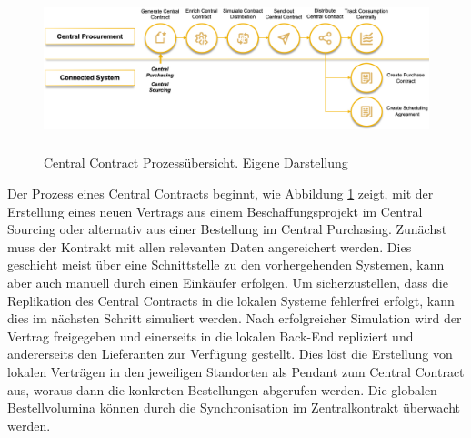 \begin{figure}[H]
    \centering
    \includegraphics[height=4.76cm]{Bilder/Central_Contract_Process3.png}
    \caption[Central Contract Prozessübersicht]{Central Contract Prozessübersicht. Eigene Darstellung}
    \label{fig:Central_Contract_Process3}
\end{figure}

Der Prozess eines Central Contracts beginnt, wie Abbildung \ref{fig:Central_Contract_Process3} zeigt, mit der Erstellung eines neuen Vertrags aus einem Beschaffungsprojekt im Central Sourcing oder alternativ aus einer Bestellung im Central Purchasing. Zunächst muss der Kontrakt mit allen relevanten Daten angereichert werden. Dies geschieht meist über eine Schnittstelle zu den vorhergehenden Systemen, kann aber auch manuell durch einen Einkäufer erfolgen. Um sicherzustellen, dass die Replikation des Central Contracts in die lokalen Systeme fehlerfrei erfolgt, kann dies im nächsten Schritt simuliert werden. Nach erfolgreicher Simulation wird der Vertrag freigegeben und einerseits in die lokalen Back-End repliziert und andererseits den Lieferanten zur Verfügung gestellt. Dies löst die Erstellung von lokalen Verträgen in den jeweiligen Standorten als Pendant zum Central Contract aus, woraus dann die konkreten Bestellungen abgerufen werden. Die globalen Bestellvolumina können durch die Synchronisation im Zentralkontrakt überwacht werden.